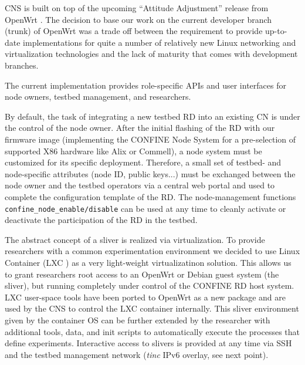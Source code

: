 \documentclass[conference]{IEEEtran}
\begin{document}
CNS is built on top of the upcoming ``Attitude Adjustment'' release
from OpenWrt \cite{attitudeAdjustment}. The decision to base our work
on the current developer branch (trunk) of OpenWrt was a trade off
between the requirement to provide up-to-date implementations for
quite a number of relatively new Linux networking and virtualization
technologies and the lack of maturity that comes with development
branches. 

The current implementation provides role-specific APIs and user
interfaces for node owners, testbed management, and researchers.

By default, the task of integrating a new testbed RD into an existing
CN is under the control of the node owner.  After the initial flashing
of the RD with our firmware image (implementing the CONFINE Node
System for a pre-selection of supported X86 hardware like Alix or
Commell), a node system must be customized for its specific deployment.
Therefore, a small set of testbed- and node-specific attributes
(node ID, public keys...) must be exchanged between the node owner
and the testbed operators via a central web portal and used to
complete the configuration template of the RD.  The
node-management functions \texttt{confine\_node\_enable/disable} can be used at
any time to cleanly activate or deactivate the participation of the RD
in the testbed.


The abstract concept of a sliver is realized via virtualization.  To
provide researchers with a common experimentation environment we
decided to use Linux Container (LXC \cite{lxc}) as a very light-weight
virtualizatinon solution. This allows us to grant researchers root
access to an OpenWrt or Debian guest system (the sliver), but running
completely under control of the CONFINE RD host system. LXC user-space
tools have been ported to OpenWrt as a new package and are used by
the CNS to control the LXC container internally. This sliver
environment given by the container OS can be further extended by the
researcher with additional tools, data, and init scripts to
automatically execute the processes that define experiments.
Interactive access to slivers is provided at any time via SSH and the
testbed management network (\emph{tinc} IPv6 overlay, see next point).
\end{document}

